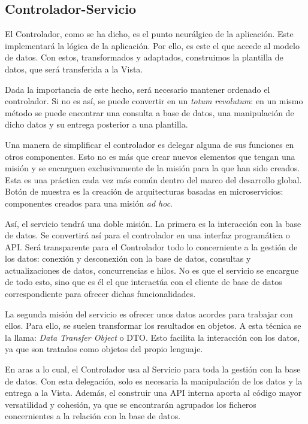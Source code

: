 \subsection{Controlador-Servicio}
El Controlador, como se ha dicho, es el punto neurálgico de la aplicación. Este implementará la lógica de la aplicación. Por ello, es este el que accede al modelo de datos. Con estos, transformados y adaptados, construimos la plantilla de datos, que será transferida a la Vista.

Dada la importancia de este hecho, será necesario mantener ordenado el controlador. Si no es así, se puede convertir en un \textit{totum revolutum}: en un mismo método se puede encontrar una consulta a base de datos, una manipulación de dicho datos y su entrega posterior a una plantilla.

Una manera de simplificar el controlador es delegar alguna de sus funciones en otros componentes. Esto no es más que crear nuevos elementos que tengan una misión y se encarguen exclusivamente de la misión para la que han sido creados. Esta es una práctica cada vez más común dentro del marco del desarrollo global. Botón de muestra es la creación de arquitecturas basadas en microservicios: componentes creados para una misión \textit{ad hoc}.

Así, el servicio tendrá una doble misión. La primera es la interacción con la base de datos. Se convertirá así para el controlador en una interfaz programática o API. Será transparente para el Controlador todo lo concerniente a la gestión de los datos: conexión y desconexión con la base de datos, consultas y actualizaciones de datos, concurrencias e hilos. No es que el servicio se encargue de todo esto, sino que es él el que interactúa con el cliente de base de datos correspondiente para ofrecer dichas funcionalidades.

La segunda misión del servicio es ofrecer unos datos acordes para trabajar con ellos. Para ello, se suelen transformar los resultados en objetos. A esta técnica se la llama: \textit{Data Transfer Object} o DTO. Esto facilita la interacción con los datos, ya que son tratados como objetos del propio lenguaje.

En aras a lo cual, el Controlador usa al Servicio para toda la gestión con la base de datos. Con esta delegación, solo es necesaria la manipulación de los datos y la entrega a la Vista. Además, el construir una API interna aporta al código mayor versatilidad y cohesión, ya que se encontrarán agrupados los ficheros concernientes a la relación con la base de datos.

